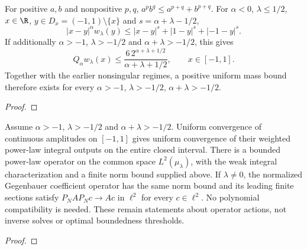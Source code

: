 \begin{supporting}

\begin{theorem}
\label{thm:power-law-singular-mass}
\leanok
For positive $a,b$ and nonpositive $p,q$,
$a^pb^q\le a^{p+q}+b^{p+q}$.
For $\alpha<0$, $\lambda\le1/2$, $x\in\R$, $y\in D_x=(-1,1)\setminus\{x\}$ and $s=\alpha+\lambda-1/2$,
\[
 |x-y|^\alpha w_\lambda(y)
 \le |x-y|^s+|1-y|^s+|-1-y|^s.
\]
If additionally $\alpha>-1$, $\lambda>-1/2$ and $\alpha+\lambda>-1/2$, this gives
\[
 Q_\alpha w_\lambda(x)\le
 \frac{6\,2^{\alpha+\lambda+1/2}}{\alpha+\lambda+1/2},
 \qquad x\in[-1,1].
\]
 Together with the earlier nonsingular regimes,
a positive uniform mass bound therefore exists for every
$\alpha>-1$, $\lambda>-1/2$, $\alpha+\lambda>-1/2$.

\end{theorem}
\begin{proof}
\leanok
\end{proof}




\begin{theorem}
\label{thm:power-law-endpoint-l2}
\leanok
Assume $\alpha>-1$, $\lambda>-1/2$ and $\alpha+\lambda>-1/2$.
Uniform convergence of continuous amplitudes on $[-1,1]$ gives uniform convergence
of their weighted power-law integral outputs on the entire closed interval.
There is a bounded power-law operator on the common space $L^2(\mu_\lambda)$,
with the weak integral characterization and a finite norm bound supplied above.
If $\lambda\ne0$, the normalized Gegenbauer coefficient operator has the same norm bound and its leading finite sections satisfy $P_NAP_Nc\to Ac$ in
$\ell^2$ for every $c\in\ell^2$. No polynomial compatibility is needed.
These remain statements about operator actions, not inverse solves or optimal
boundedness thresholds.
\end{theorem}
\begin{proof}
\leanok
\end{proof}



\end{supporting}
